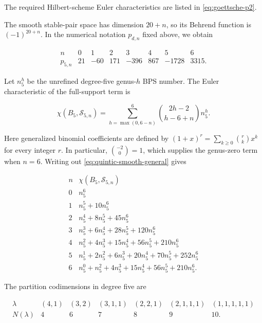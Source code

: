 \documentclass[11pt,reqno]{amsart}
\theoremstyle{definition}
\begin{document}
The required Hilbert-scheme Euler characteristics are listed in
\eqref{eq:goettsche-p2}.

The smooth stable-pair space has dimension $20+n$, so its Behrend function
is $(-1)^{20+n}$.  In the numerical notation $p_{d,n}$ fixed above, we
obtain

\begin{equation}\label{eq:quintic-PT-table}
\begin{array}{c|rrrrrrr}
n&0&1&2&3&4&5&6\\ \hline
p_{5,n}&21&-60&171&-396&867&-1728&3315.
\end{array}
\end{equation}

Let $n_5^h$ be the unrefined degree-five genus-$h$ BPS number.  The Euler
characteristic of the full-support term is

\begin{equation}\label{eq:quintic-smooth-general}
  \chi(B_5,\mathcal S_{5,n})
  =\sum_{h=\max(0,6-n)}^6
   \binom{2h-2}{h-6+n}n_5^h.
\end{equation}

Here generalized binomial coefficients are defined by
$(1+x)^r=\sum_{k\ge0}\binom rkx^k$ for every integer $r$.  In particular,
$\binom{-2}{0}=1$, which supplies the genus-zero term when $n=6$.
Writing out \eqref{eq:quintic-smooth-general} gives

\begin{equation}\label{eq:quintic-smooth-table}
\begin{array}{c|l}
n&\chi(B_5,\mathcal S_{5,n})\\ \hline
0&n_5^6\\
1&n_5^5+10n_5^6\\
2&n_5^4+8n_5^5+45n_5^6\\
3&n_5^3+6n_5^4+28n_5^5+120n_5^6\\
4&n_5^2+4n_5^3+15n_5^4+56n_5^5+210n_5^6\\
5&n_5^1+2n_5^2+6n_5^3+20n_5^4+70n_5^5+252n_5^6\\
6&n_5^0+n_5^2+4n_5^3+15n_5^4+56n_5^5+210n_5^6.
\end{array}
\end{equation}

The partition codimensions in degree five are

\[
\begin{array}{c|rrrrrr}
\lambda&(4,1)&(3,2)&(3,1,1)&(2,2,1)&(2,1,1,1)&(1,1,1,1,1)\\ \hline
N(\lambda)&4&6&7&8&9&10.
\end{array}
\]
\end{document}
